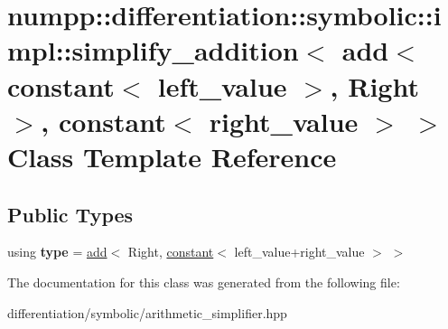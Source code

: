 \hypertarget{classnumpp_1_1differentiation_1_1symbolic_1_1impl_1_1simplify__addition_3_01add_3_01constant_3_0a2e8fcb21917ecf6b67a5c4cb33302f3}{}\section{numpp\+:\+:differentiation\+:\+:symbolic\+:\+:impl\+:\+:simplify\+\_\+addition$<$ add$<$ constant$<$ left\+\_\+value $>$, Right $>$, constant$<$ right\+\_\+value $>$ $>$ Class Template Reference}
\label{classnumpp_1_1differentiation_1_1symbolic_1_1impl_1_1simplify__addition_3_01add_3_01constant_3_0a2e8fcb21917ecf6b67a5c4cb33302f3}
\subsection*{Public Types}
\begin{DoxyCompactItemize}
\item 
\mbox{\label{classnumpp_1_1differentiation_1_1symbolic_1_1impl_1_1simplify__addition_3_01add_3_01constant_3_0a2e8fcb21917ecf6b67a5c4cb33302f3_a2c40394ffe8200871c08e0feed6a1b49}} 
using {\bfseries type} = \hyperlink{classnumpp_1_1differentiation_1_1symbolic_1_1add}{add}$<$ Right, \hyperlink{classnumpp_1_1differentiation_1_1symbolic_1_1constant}{constant}$<$ left\+\_\+value+right\+\_\+value $>$ $>$
\end{DoxyCompactItemize}


The documentation for this class was generated from the following file\+:\begin{DoxyCompactItemize}
\item 
differentiation/symbolic/arithmetic\+\_\+simplifier.\+hpp\end{DoxyCompactItemize}
